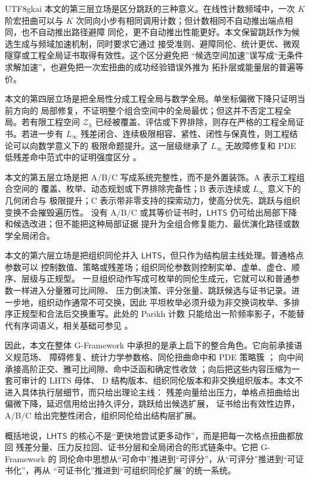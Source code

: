 \documentclass[12pt]{article}
\newcommand{\GFramework}{\textsf{G-Framework}}
\newcommand{\LHTS}{\ensuremath{\mathsf{LHTS}}}
\newcommand{\Linfty}{\ensuremath{L_\infty}}
\begin{document}
\begin{CJK*}{UTF8}{gkai}
本文的第三层立场是区分跳跃的三种意义。在线性计数频域中，一次 \(K\) 阶宏扭曲可以与
\(K\) 次同向小步有相同调用计数；但计数相同不自动推出端点相同，也不自动推出路径避障
同伦，更不自动推出性能更好。本文保留跳跃作为候选生成与频域加速机制，同时要求它通过
接受准则、避障同伦、统计更优、微观隧穿或工程全局证书取得有效性。这个区分避免把
“候选空间加速”误写成“无条件求解加速”，也避免把一次宏扭曲的成功经验错误外推为
拓扑层或能量层的普遍等价。

本文的第四层立场是把全局性分成工程全局与数学全局。单坐标偏微下降只证明当前方向的
局部修复，不证明整个组合空间中的全局最优；但这并不否定工程全局。若有限工程空间
\(\mathcal Z_h\) 已经被覆盖、评估或下界排除，则存在严格的工程全局证书。若进一步有
\(\Linfty\) 残差闭合、连续极限相容、紧性、闭性与保真性，则工程结论可以向数学意义下的
极限命题提升。这一层级继承了 \(\Linfty\) 无故障修复和 PDE 低残差命中范式中的证明强度区分
\cite{RepoTex50LinftyRepair,RepoTex55PDEParadigm}。

本文的第五层立场是把 A/B/C 写成系统完整性，而不是外置装饰。A 表示工程组合空间的
覆盖、枚举、动态规划或下界排除完备性；B 表示连续或 \(\Linfty\) 意义下的几何闭合与
极限提升；C 表示带非零支持的探索动力，使高分优先、跳跃与组织变换不会摧毁遍历性。
没有 A/B/C 或其等价证书时，\LHTS{} 仍可给出局部下降和候选改进；但不能把这种局部证据
提升为全组合修复能力、最优演化路径或数学全局闭合。

本文的第六层立场是把组织同伦并入 \LHTS{}，但只作为结构层主线处理。普通格点参数可以
控制数值、策略或残差场；组织同伦参数则控制实单、虚单、虚仓、顺序、层级与正规型。
一旦组织动作写成可枚举的同伦生成元，它就可以和普通参数一样进入分量雅可比间隙、
压力倒决策、评分张量、跳跃候选与证书记录。进一步地，组织动作通常不可交换，因此
平坦枚举必须升级为非交换词枚举、多排序正规型和合法后交换重写。此处的 Parikh 计数
只能给出一阶频率影子，不能替代有序词语义，相关基础可参见
\cite{Parikh1966ContextFree,BaaderNipkow1998TermRewriting}。

因此，本文在整体 \GFramework{} 中承担的是承上启下的整合角色。它向前承接语义规范场、
障碍修复、统计力学参数格、同伦扭曲命中和 PDE 策略簇
\cite{RepoTex37SemanticGauge,RepoTex45ObstructionGlobalSection,RepoTex53StrategyCluster}；
向中间承接高阶正交、雅可比间隙、命中泛函和确定性收敛
\cite{RepoTex55PDEParadigm}；向后把这些内容压缩为一套可审计的 LHTS 母体、
D 结构版本、组织同伦版本和非交换组织版本。本文不进入具体执行层细节，而只给出理论主线：
残差向量给出压力，单格点扭曲给出偏微下降，延迟信用给出持久评分，跳跃给出候选扩展，
证书给出有效性边界，A/B/C 给出完整性闭合，组织同伦给出结构层扩展。

概括地说，\LHTS{} 的核心不是“更快地尝试更多动作”，而是把每一次格点扭曲都放回
残差分量、压力反拉回、证书分层和全局闭合的形式链条中。它把 \GFramework{} 的
同伦命中思想从“可命中”推进到“可评分”，从“可评分”推进到“可证书化”，再从
“可证书化”推进到“可组织同伦扩展”的统一系统。


\end{CJK*}
\end{document}

